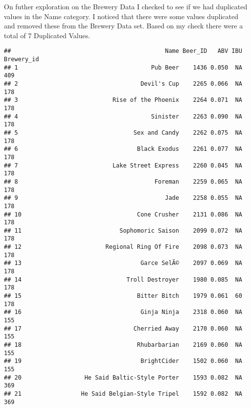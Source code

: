 \documentclass[
]{article}
\newenvironment{Shaded}{\begin{snugshade}}{\end{snugshade}}
\newcommand{\CommentTok}[1]{\textcolor[rgb]{0.56,0.35,0.01}{\textit{#1}}}
\newcommand{\KeywordTok}[1]{\textcolor[rgb]{0.13,0.29,0.53}{\textbf{#1}}}
\newcommand{\NormalTok}[1]{#1}
\newcommand{\OperatorTok}[1]{\textcolor[rgb]{0.81,0.36,0.00}{\textbf{#1}}}
\newcommand{\StringTok}[1]{\textcolor[rgb]{0.31,0.60,0.02}{#1}}
\begin{document}
On futher exploration on the Brewery Data I checked to see if we had
duplicated values in the Name category. I noticed that there were some
values duplicated and removed these from the Brewery Data set. Based on
my check there were a total of 7 Duplicated Values.

\begin{Shaded}
\end{Shaded}

\begin{verbatim}
##                                            Name Beer_ID   ABV IBU Brewery_id
## 1                                      Pub Beer    1436 0.050  NA        409
## 2                                   Devil's Cup    2265 0.066  NA        178
## 3                           Rise of the Phoenix    2264 0.071  NA        178
## 4                                      Sinister    2263 0.090  NA        178
## 5                                 Sex and Candy    2262 0.075  NA        178
## 6                                  Black Exodus    2261 0.077  NA        178
## 7                           Lake Street Express    2260 0.045  NA        178
## 8                                       Foreman    2259 0.065  NA        178
## 9                                          Jade    2258 0.055  NA        178
## 10                                 Cone Crusher    2131 0.086  NA        178
## 11                            Sophomoric Saison    2099 0.072  NA        178
## 12                        Regional Ring Of Fire    2098 0.073  NA        178
## 13                                  Garce SelÃ©    2097 0.069  NA        178
## 14                              Troll Destroyer    1980 0.085  NA        178
## 15                                 Bitter Bitch    1979 0.061  60        178
## 16                                  Ginja Ninja    2318 0.060  NA        155
## 17                                Cherried Away    2170 0.060  NA        155
## 18                                 Rhubarbarian    2169 0.060  NA        155
## 19                                  BrightCider    1502 0.060  NA        155
## 20                  He Said Baltic-Style Porter    1593 0.082  NA        369
## 21                 He Said Belgian-Style Tripel    1592 0.082  NA        369

\end{verbatim}
\end{document}
